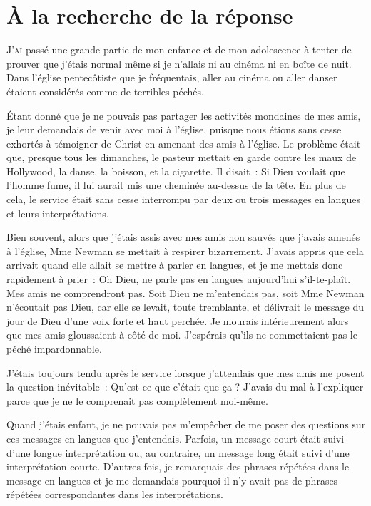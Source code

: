\chapter{À la recherche de la réponse}

\lettrine[lines=3]{J}{'ai} passé une grande partie de mon enfance et de mon adolescence à tenter de prouver que j'étais normal même si je n'allais ni au cinéma ni en boîte de nuit. Dans l'église pentecôtiste que je fréquentais, aller au cinéma ou aller danser étaient considérés comme de terribles péchés.

Étant donné que je ne pouvais pas partager les activités mondaines de mes amis, je leur demandais de venir avec moi à l'église, puisque nous étions sans cesse exhortés à témoigner de Christ en amenant des amis à l'église. Le problème était que, presque tous les dimanches, le pasteur mettait en garde contre les maux de Hollywood, la danse, la boisson, et la cigarette. Il disait~: \og Si Dieu voulait que l'homme fume, il lui aurait mis une cheminée au-dessus de la tête.\fg{} En plus de cela, le service était sans cesse interrompu par deux ou trois \og messages en langues \fg{} et leurs interprétations.

Bien souvent, alors que j'étais assis avec mes amis non sauvés que j'avais amenés à l'église, Mme Newman se mettait à respirer bizarrement. J'avais appris que cela arrivait quand elle allait se mettre à parler en langues, et je me mettais donc rapidement à prier~: \og Oh Dieu, ne parle pas en langues aujourd'hui s'il-te-plaît. Mes amis ne comprendront pas. \fg{} Soit Dieu ne m'entendais pas, soit Mme Newman n'écoutait pas Dieu, car elle se levait, toute tremblante, et délivrait le message du jour de Dieu d'une voix forte et haut perchée. Je mourais intérieurement alors que mes amis gloussaient à côté de moi. J'espérais qu'ils ne commettaient pas le péché impardonnable.

J'étais toujours tendu après le service lorsque j'attendais que mes amis me posent la question inévitable~: \og Qu'est-ce que c'était que ça ? \fg{} J'avais du mal à l'expliquer parce que je ne le comprenait pas complètement moi-même.

Quand j'étais enfant, je ne pouvais pas m'empêcher de me poser des questions sur ces \og messages en langues \fg{} que j'entendais. Parfois, un message court était suivi d'une longue interprétation ou, au contraire, un message long était suivi d'une interprétation courte. D'autres fois, je remarquais des phrases répétées dans le message en langues et je me demandais pourquoi il n'y avait pas de phrases répétées correspondantes dans les interprétations.

